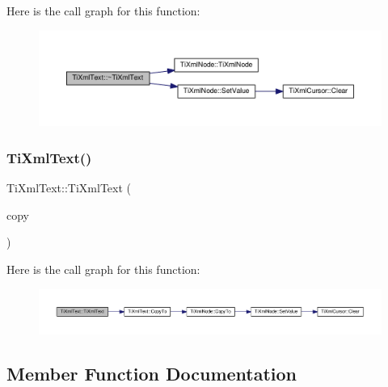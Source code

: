 Here is the call graph for this function\+:\nopagebreak
\begin{figure}[H]
\begin{center}
\leavevmode
\includegraphics[width=350pt]{class_ti_xml_text_a829a4bd2d8d2461c333eb4f3f5b1b3d2_cgraph}
\end{center}
\end{figure}
\mbox{\label{class_ti_xml_text_a8d2cc1b4af2208cbb0171cf20f6815d1}} 
\subsubsection{\texorpdfstring{Ti\+Xml\+Text()}{TiXmlText()}\hspace{0.1cm}{\footnotesize\ttfamily [2/2]}}
{\footnotesize\ttfamily Ti\+Xml\+Text\+::\+Ti\+Xml\+Text (\begin{DoxyParamCaption}\item[{const \hyperlink{class_ti_xml_text}{Ti\+Xml\+Text} \&}]{copy }\end{DoxyParamCaption})\hspace{0.3cm}{\ttfamily [inline]}}

Here is the call graph for this function\+:\nopagebreak
\begin{figure}[H]
\begin{center}
\leavevmode
\includegraphics[width=350pt]{class_ti_xml_text_a8d2cc1b4af2208cbb0171cf20f6815d1_cgraph}
\end{center}
\end{figure}


\subsection{Member Function Documentation}
\mbox{\label{class_ti_xml_text_af65964326eac4640bfb97d4622fa0de2}} 
